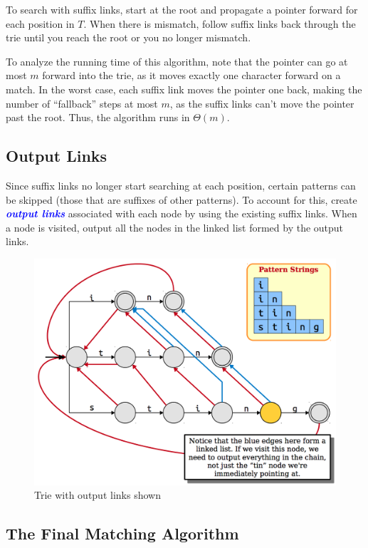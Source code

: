 \documentclass[11pt, oneside]{article}
\newcommand{\emphasis}[1]{\textcolor{blue}{\textbf{\textit{#1}}}}
\begin{document}
To search with suffix links, start at the root and propagate a pointer
forward for each position in \( T \). When there is mismatch, follow suffix links back through the trie until you reach the root
or you no longer mismatch.

To analyze the running time of this algorithm, note that the pointer can go
at most \( m \) forward into the trie, as it moves exactly one character forward on a match.
In the worst case, each suffix link moves the pointer one back, making the
number of ``fallback'' steps at most \( m \), as the suffix links can't move the pointer past the root.
Thus, the algorithm runs in \( \Theta(m) \).

\newpage

\subsection{Output Links}

Since suffix links no longer start searching at each position,
certain patterns can be skipped (those that are suffixes of other patterns).
To account for this, create \\ \emphasis{output links} associated with each node by using
the existing suffix links.
When a node is visited, output all the nodes in the linked list formed by the output links.

\begin{figure}[h!]
\centering
\includegraphics[scale=0.25]{output}
\caption{Trie with output links shown}
\end{figure}

\subsection{The Final Matching Algorithm}
\end{document}
